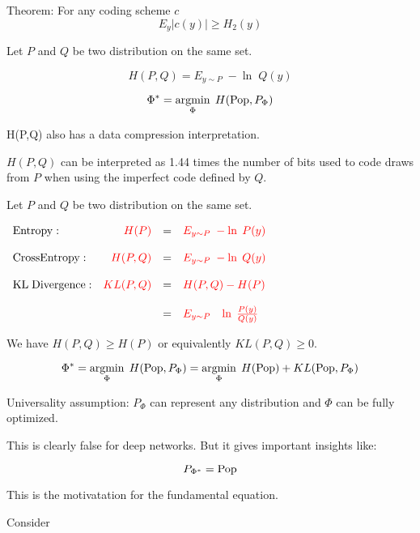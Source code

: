 {{\vfill
Theorem: For any coding scheme $c$
$$E_y |c(y)| \geq H_2(y)$$
}


Let $P$ and $Q$ be two distribution on the same set.

{\color{red} $$H(P,Q) = E_{y \sim P} \;-\ln \;Q(y)$$}

{\color{red} $$\Phi^* = \operatorname*{argmin}_\Phi \;H(\mathrm{Pop},P_\Phi)$$}

\vfill
{\color{red} H(P,Q)} also has a data compression interpretation.

\vfill
{\color{red} $H(P,Q)$} can be interpreted as 1.44 times the number of bits used to code draws from $P$ when using the imperfect code defined by $Q$.


Let $P$ and $Q$ be two distribution on the same set.

\vfill
\centerline{
  $\begin{array}{lrcl}
\mathrm{Entropy}: & {\color{red} H(P)} & = & {\color{red} E_{y \sim P}\;-\ln\;P(y)} \\
\\
\mathrm{Cross Entropy:} & {\color{red} H(P,Q)} & = & {\color{red} E_{y \sim P}\;-\ln\;Q(y)} \\
\\
\mathrm{KL\; Divergence:} & {\color{red} KL(P,Q)} & = & {\color{red} H(P,Q) - H(P)} \\
\\
& & = & {\color{red} E_{y \sim P}\;\;\; \ln\;\frac{P(y)}{Q(y)}}
\end{array}$}

\vfill
We have {\color{red} $H(P,Q) \geq H(P)$} or equivalently {\color{red} $KL(P,Q) \geq 0$}.


{\color{red} $$\Phi^* = \operatorname*{argmin}_\Phi\;H(\mathrm{Pop},P_\Phi) = \operatorname*{argmin}_\Phi\;H(\mathrm{Pop}) + KL(\mathrm{Pop},P_\Phi)$$}

\vfill
Universality assumption: {\color{red} $P_\Phi$ can represent any distribution and $\Phi$ can be fully optimized.}

\vfill
This is clearly false for deep networks.  {\color{red} But it gives important insights like:}

{\color{red} $$P_{\Phi^*} = \mathrm{Pop}$$}

\vfill
{\color{red} \centerline{This is the motivatation for the fundamental equation.}}


Consider 


}
